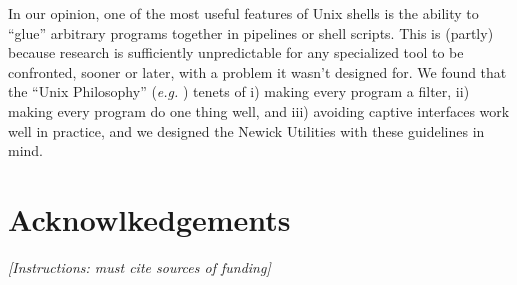 \documentclass{article}
\begin{document}
In our opinion, one of the most useful features of Unix shells is the ability
to  ``glue'' arbitrary programs together in pipelines or shell scripts. This
is (partly) because research is sufficiently unpredictable for any specialized
tool to be confronted, sooner or later, with a problem it wasn't designed for.
We found that the ``Unix Philosophy'' (\textit{e.g.} \cite{Gancarz2002})
tenets of i) making every program a filter, ii) making every program do one
thing well, and iii) avoiding captive interfaces work well in practice, and we
designed the Newick Utilities with these guidelines in mind. 

\section*{Acknowlkedgements}
\emph{[Instructions: must cite sources of funding]}

 

\end{document}
